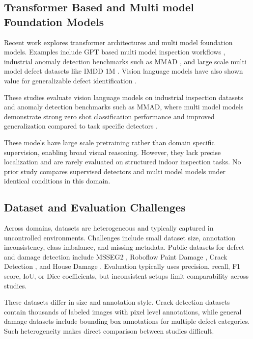 \subsection{Transformer Based and Multi model Foundation Models}

Recent work explores transformer architectures and multi model foundation models. Examples include GPT based multi model inspection workflows \cite{wen_autonomous_2024}, industrial anomaly detection benchmarks such as MMAD \cite{jiang_mmad_2025}, and large scale multi model defect datasets like IMDD 1M \cite{ni_towards_2026}. Vision language models have also shown value for generalizable defect identification \cite{malla_enhancing_2025}.

These studies evaluate vision language models on industrial inspection datasets and anomaly detection benchmarks such as MMAD, where multi model models demonstrate strong zero shot classification performance and improved generalization compared to task specific detectors \cite{jiang_mmad_2025}.

These models have large scale pretraining rather than domain specific supervision, enabling broad visual reasoning. However, they lack precise localization and are rarely evaluated on structured indoor inspection tasks. No prior study compares supervised detectors and multi model models under identical conditions in this domain.

\subsection{Dataset and Evaluation Challenges}

Across domains, datasets are heterogeneous and typically captured in uncontrolled environments. Challenges include small dataset size, annotation inconsistency, class imbalance, and missing metadata. Public datasets for defect and damage detection include MSSEG2 \cite{noauthor_data_nodate}, Roboflow Paint Damage \cite{hkust_paint_nodate}, Crack Detection \cite{noauthor_crack_nodate}, and House Damage \cite{noauthor_house_nodate}. Evaluation typically uses precision, recall, F1 score, IoU, or Dice coefficients, but inconsistent setups limit comparability across studies.

These datasets differ in size and annotation style. Crack detection datasets contain thousands of labeled images with pixel level annotations, while general damage datasets include bounding box annotations for multiple defect categories. Such heterogeneity makes direct comparison between studies difficult.

